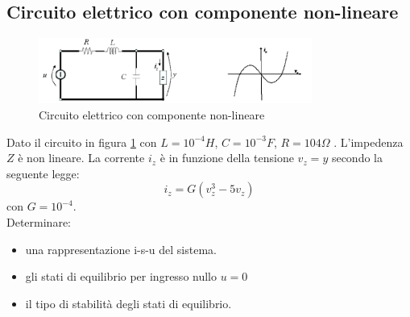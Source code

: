 \documentclass[a4paper]{report}
\begin{document}
\subsection{Circuito elettrico con componente non-lineare}
\begin{figure}[!t]
\centering
\includegraphics[width=0.8\textwidth]{./images/esempio04.png}
\caption{Circuito elettrico con componente non-lineare\label{fig:esempio04}}
\end{figure}
Dato il circuito in figura \ref{fig:esempio04} con $L = 10^{-4}H$, $C
= 10^{-3}F$, $R = 104\Omega$ . L'impedenza $Z$ \`e non lineare. La
corrente $i_z$ \`e in funzione della tensione $v_z = y$ secondo la
seguente legge: $$i_z = G (v_z^3 - 5v_z )$$ con $G = 10^{-4}$. \\
Determinare:
\begin{itemize}
\item una rappresentazione i-s-u del sistema.
\item gli stati di equilibrio per ingresso nullo $u = 0$
\item il tipo di stabilit\`a degli stati di equilibrio.
\end{itemize}
\end{document}
